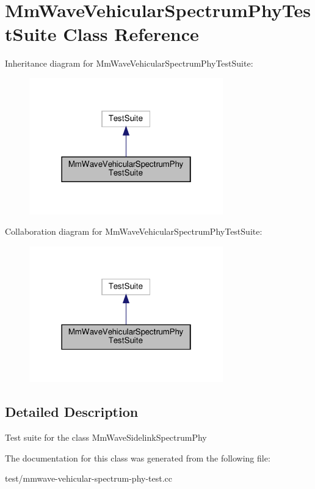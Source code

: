 \hypertarget{classMmWaveVehicularSpectrumPhyTestSuite}{}\section{Mm\+Wave\+Vehicular\+Spectrum\+Phy\+Test\+Suite Class Reference}
\label{classMmWaveVehicularSpectrumPhyTestSuite}


Inheritance diagram for Mm\+Wave\+Vehicular\+Spectrum\+Phy\+Test\+Suite\+:
\nopagebreak
\begin{figure}[H]
\begin{center}
\leavevmode
\includegraphics[width=238pt]{classMmWaveVehicularSpectrumPhyTestSuite__inherit__graph}
\end{center}
\end{figure}


Collaboration diagram for Mm\+Wave\+Vehicular\+Spectrum\+Phy\+Test\+Suite\+:
\nopagebreak
\begin{figure}[H]
\begin{center}
\leavevmode
\includegraphics[width=238pt]{classMmWaveVehicularSpectrumPhyTestSuite__coll__graph}
\end{center}
\end{figure}


\subsection{Detailed Description}
Test suite for the class Mm\+Wave\+Sidelink\+Spectrum\+Phy 

The documentation for this class was generated from the following file\+:\begin{DoxyCompactItemize}
\item 
test/mmwave-\/vehicular-\/spectrum-\/phy-\/test.\+cc\end{DoxyCompactItemize}
